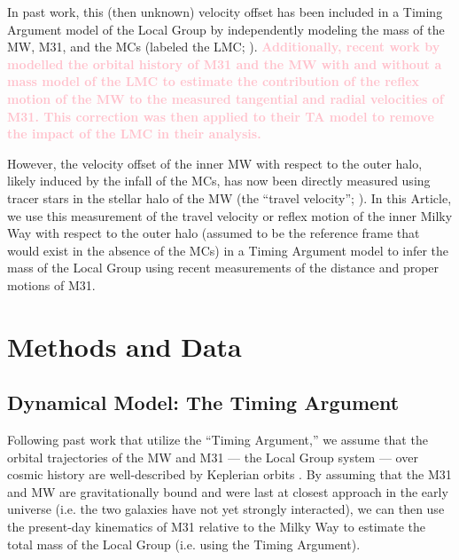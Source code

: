 \documentclass[twocolumn]{aastex631}
\newcommand{\kc}[1]{\textcolor{pink}{\textbf{#1}} }
\begin{document}
In past work, this (then unknown) velocity offset has been included in a Timing
Argument model of the Local Group by independently modeling the mass of the MW,
M31, and the MCs (labeled the LMC; \citealt{Penarrubia2016}).
\kc{Additionally, recent work by \cite{Benisty2022} modelled the orbital history
of M31 and the MW with and without a mass model of the LMC to estimate the
contribution of the reflex motion of the MW to the measured tangential and
radial velocities of M31.
This correction was then applied to their TA model to remove the impact of the
LMC in their analysis.}


However, the velocity offset of the inner MW with respect to the outer halo,
likely induced by the infall of the MCs, has now been directly measured using
tracer stars in the stellar halo of the MW (the ``travel velocity'';
\citealt{Petersen2021}).
In this Article, we use this measurement of the travel velocity or reflex motion
of the inner Milky Way with respect to the outer halo (assumed to be the
reference frame that would exist in the absence of the MCs) in a Timing Argument
model to infer the mass of the Local Group using recent measurements of the
distance and proper motions of M31.



\section{Methods and Data}

\subsection{Dynamical Model: The Timing Argument}
\label{sec:timingarg}

Following past work that utilize the ``Timing Argument,'' we assume that the
orbital trajectories of the MW and M31 --- the Local Group system --- over
cosmic history are well-described by Keplerian orbits \citep[e.g.,][]{Kahn1959,
Kroeker1991, Lynden-Bell:1981, LiWhite2008, vdm2012, Penarrubia2016}.
By assuming that the M31 and MW are gravitationally bound and were last at
closest approach in the early universe (i.e. the two galaxies have not yet
strongly interacted), we can then use the present-day kinematics of M31 relative
to the Milky Way to estimate the total mass of the Local Group (i.e. using the
Timing Argument).
\end{document}

